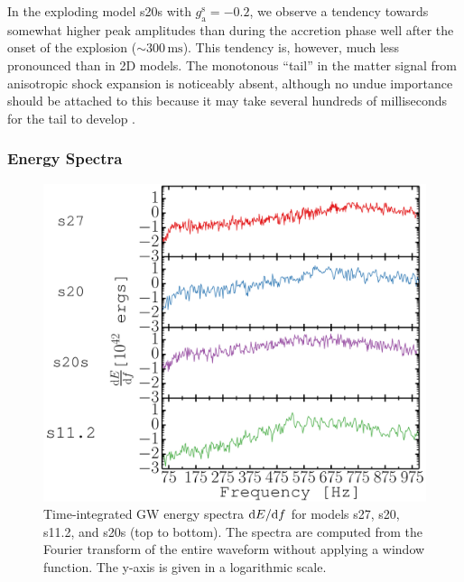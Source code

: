 In the exploding model s20s with $g_\mathrm{a}^\mathrm{s}=-0.2$, we
observe a tendency towards somewhat higher peak amplitudes than during
the accretion phase well after the onset of the explosion
($\mathord{\sim} 300 \, \mathrm{ms}$). This tendency is, however, much
less pronounced than in 2D models. The monotonous ``tail'' in the
matter signal from anisotropic shock expansion
\citep{murphy_09,yakunin_10} is noticeably absent, although no undue
importance should be attached to this because it may take several
hundreds of milliseconds for the tail to develop \citep{mueller_13}.

\subsubsection{Energy Spectra}
\begin{figure}
\includegraphics[width=0.99\linewidth]{./images/chp1/fig2.pdf}
\caption{Time-integrated GW energy spectra $\mathrm{d} E/ \mathrm{d} f$ for models s27,
s20, s11.2, and s20s (top to bottom). The spectra
are computed from the Fourier transform of the entire waveform
without applying a window function. The y-axis is given in a logarithmic scale.
\label{fig:energy_spectra}}
\end{figure}

